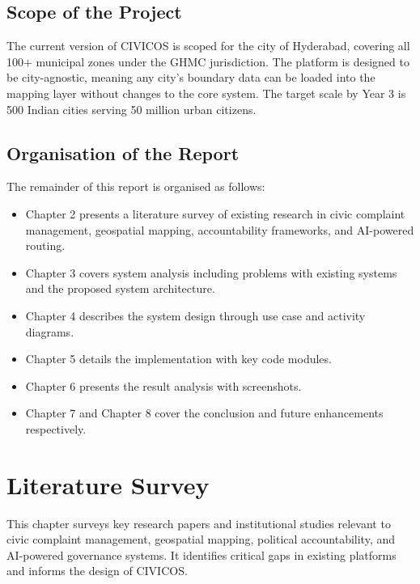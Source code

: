 \documentclass[12pt,a4paper]{report}
\begin{document}
\section{Scope of the Project}

The current version of CIVICOS is scoped for the city of Hyderabad, covering
all 100+ municipal zones under the GHMC jurisdiction. The platform is designed
to be city-agnostic, meaning any city's boundary data can be loaded into the
mapping layer without changes to the core system. The target scale by Year 3 is
500 Indian cities serving 50 million urban citizens.

\section{Organisation of the Report}

The remainder of this report is organised as follows:

\begin{itemize}
    \item Chapter 2 presents a literature survey of existing research in civic
    complaint management, geospatial mapping, accountability frameworks, and
    AI-powered routing.
    \item Chapter 3 covers system analysis including problems with existing
    systems and the proposed system architecture.
    \item Chapter 4 describes the system design through use case and activity
    diagrams.
    \item Chapter 5 details the implementation with key code modules.
    \item Chapter 6 presents the result analysis with screenshots.
    \item Chapter 7 and Chapter 8 cover the conclusion and future enhancements
    respectively.
\end{itemize}

\chapter{Literature Survey}

This chapter surveys key research papers and institutional studies relevant to civic complaint management, geospatial mapping, political accountability, and AI-powered governance systems. It identifies critical gaps in existing platforms and informs the design of CIVICOS.
\end{document}
